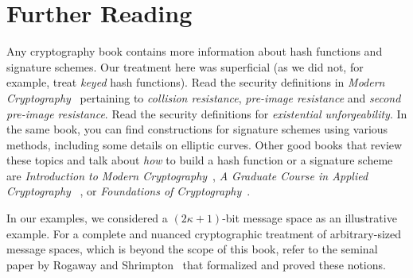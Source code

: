 \section*{Further Reading}

Any cryptography book contains more information about hash functions and signature schemes.
Our treatment here was superficial (as we did not, for example, treat \emph{keyed} hash functions).
Read the security definitions in \emph{Modern Cryptography}~\cite{katz} pertaining to \emph{collision resistance},
\emph{pre-image resistance} and \emph{second pre-image resistance}. Read the security definitions
for \emph{existential unforgeability}. In the same book, you can find constructions for signature
schemes using various methods, including some details on elliptic curves.
Other good books that review these topics and talk about \emph{how} to build a hash function or
a signature scheme are
\emph{Introduction to Modern Cryptography}~\cite{katz},
\emph{A Graduate Course in Applied Cryptography }~\cite{cryptobook},
or
\emph{Foundations of Cryptography}~\cite{foundations1,foundations2}.

In our examples, we considered a $(2\kappa+1)$-bit message space as an illustrative example.
For a complete and nuanced cryptographic treatment of arbitrary-sized message spaces,
which is beyond the scope of this book, refer to the seminal paper by
Rogaway and Shrimpton~\cite{rogaway2004cryptographic} that formalized and proved these notions.
